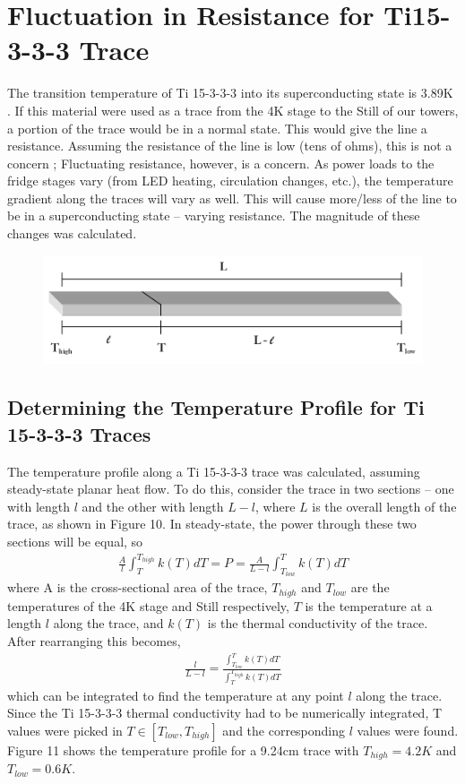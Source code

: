 \documentclass{article}
\begin{document}
\newpage
\section{Fluctuation in Resistance for Ti15-3-3-3 Trace}
The transition temperature of Ti 15-3-3-3 into its superconducting state is 3.89K \cite{wik}. If this material were used as a trace from the 4K stage to the Still of our towers, a portion of the trace would be in a normal state. This would give the line a resistance. Assuming the resistance of the line is low (tens of ohms), this is not a concern ; Fluctuating resistance, however, is a concern. As power loads to the fridge stages vary (from LED heating, circulation changes, etc.), the temperature gradient along the traces will vary as well. This will cause more/less of the line to be in a superconducting state -- varying resistance. The magnitude of these changes was calculated.

\begin{figure}[h]
\centering
\includegraphics[width = .5\textwidth]{Ti15333_trace_resistivity_section.png}
\caption{}
\end{figure}

\subsection{Determining the Temperature Profile for Ti 15-3-3-3 Traces}
The temperature profile along a Ti 15-3-3-3 trace was calculated, assuming steady-state planar heat flow. To do this, consider the trace in two sections -- one with length $l$ and the other with length $L-l$, where $L$ is the overall length of the trace, as shown in Figure 10. In steady-state, the power through these two sections will be equal, so
\begin{eqnarray}
\frac{A}{l}\int_{T}^{T_{high}} k(T)dT = P = \frac{A}{L - l}\int_{T_{low}}^{T} k(T)dT
\end{eqnarray}
where A is the cross-sectional area of the trace, $T_{high}$ and $T_{low}$ are the temperatures of the 4K stage and Still respectively, $T$ is the temperature at a length $l$ along the trace, and $k(T)$ is the thermal conductivity of the trace. After rearranging this becomes,
\begin{eqnarray}
\frac{l}{L-l} = \frac{\int_{T_{low}}^{T} k(T)dT}{\int_{T}^{T_{high}} k(T)dT}
\end{eqnarray}
which can be integrated to find the temperature at any point $l$ along the trace. Since the Ti 15-3-3-3 thermal conductivity had to be numerically integrated, T values were picked in $T \in [T_{low},T_{high}]$ and the corresponding $l$ values were found. Figure 11 shows the temperature profile for a 9.24cm trace with $T_{high} = 4.2K$ and $T_{low}=0.6K$.
\end{document}
